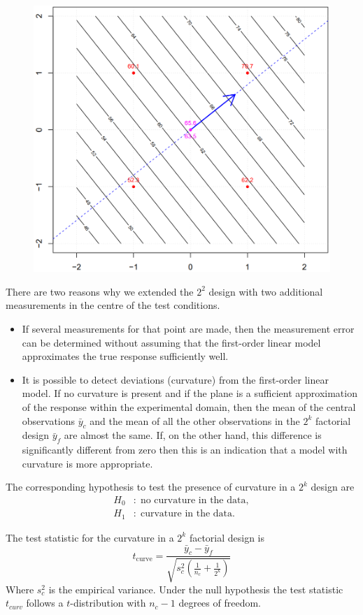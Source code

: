 \begin{figure}[H]
  \centering
  \includegraphics[width=.6\linewidth]{Pics/15.1.2.png}
\end{figure}

There are two reasons why we extended the $2^2$ design with two additional measurements in the centre of the test conditions.
\begin{itemize}
  \item If several measurements for that point are made, then the measurement error can be determined without assuming that the first-order linear model approximates the true response sufficiently well.
  \item It is possible to detect deviations (curvature) from the first-order linear model. If no curvature is present and if the plane is a sufficient approximation of the response within the experimental domain, then the mean of the central observations $\bar{y}_c$ and the mean of all the other observations in the $2^k$ factorial design $\bar{y}_f$ are almost the same. If, on the other hand, this difference is significantly different from zero then this is an indication that a model with curvature is more appropriate.\\
\end{itemize}

The corresponding hypothesis to test the presence of curvature in a $2^k$ design are
\begin{equation}
  \begin{split}
    H_0 &: \;\text{no curvature in the data},\\
    H_1 &: \;\text{curvature in the data}.
  \end{split}
\end{equation}

The test statistic for the curvature in a $2^k$ factorial design is
\begin{equation}
  t_{\text{curve}} = \frac{\bar{y}_c -\bar{y}_f}{\sqrt{s_c^2 \left(\frac{1}{n_c} + \frac{1}{2^k}\right)}}
\end{equation}
Where $s_c^2$ is the empirical variance.
Under the null hypothesis the test statistic $t_{curv}$ follows a $t$-distribution with $n_c - 1$ degrees of freedom.\\

